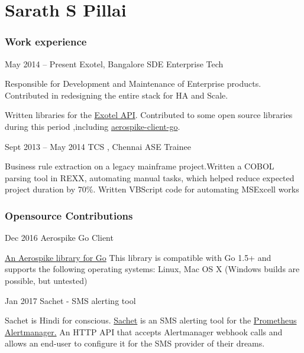 \documentclass{tccv}
\begin{document}
\part{Sarath S Pillai}

\section{Work experience}

\begin{eventlist}

\item{May 2014 -- Present}
     {Exotel, Bangalore}
     {SDE Enterprise Tech}
     
Responsible for Development and Maintenance of Enterprise products. 
Contributed in redesigning the entire stack for HA and Scale.

Written libraries for the \href{https://pypi.python.org/pypi/exotel}{Exotel API}.
Contributed to some open source libraries during this period ,including  \href{https://github.com/aerospike/aerospike-client-go}{aerospike-client-go}.


\item{Sept 2013 -- May 2014}
     {TCS , Chennai}
     {ASE Trainee}

Business rule extraction on a legacy mainframe project.Written a COBOL parsing tool in REXX, automating manual tasks, which helped reduce expected project duration by 70\%. Written VBScript 
code for automating MSExcell  works

\end{eventlist}


\section{Opensource Contributions}

\begin{eventlist}
\item{Dec 2016}{ }
     {Aerospike Go Client}
     
\href{https://github.com/aerospike/aerospike-client-go}{An Aerospike library for Go}
This library is compatible with Go 1.5+ and supports the following operating systems: Linux, Mac OS X (Windows builds are possible, but untested) 

\item{Jan 2017}{  }
     {Sachet - SMS alerting tool}
     
Sachet is Hindi for conscious.
\href{https://github.com/messagebird/sachet}{Sachet} is an SMS alerting tool for the
\href{https://github.com/prometheus/alertmanager}{Prometheus Alertmanager.}
An HTTP API that accepts Alertmanager webhook calls and allows an end-user to configure it for the SMS provider of their dreams.
\end{eventlist}
\end{document}
